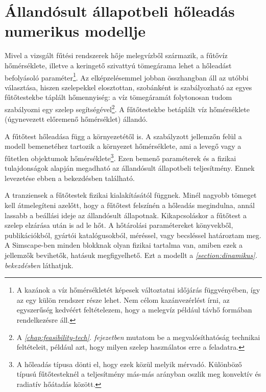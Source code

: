 \section{Állandósult állapotbeli hőleadás numerikus modellje}\label{section:allandosult}

Mivel a vizsgált fűtési rendszerek hője melegvízből származik, a fűtővíz %
hőmérséklete, illetve a keringető szivattyú tömegárama lehet a hőleadást befolyásoló paraméter\footnote{A kazánok a víz hőmérsékletét képesek változtatni időjárás függvényében, így az egy külön rendszer része lehet. Nem célom kazánvezérlést írni, az egyszerűség kedvéért feltételezem, hogy a melegvíz például távhő formában rendelkezésre áll.}. Az elképzelésemmel jobban összhangban áll az utóbbi választása, hiszen szelepekkel elosztottan, szobánként is szabályozható az egyes fűtőtestekbe táplált hőmennyiség: a víz tömegáramát folytonosan tudom szabályozni egy szelep segítségével\footnote{A \textit{\ref{chap:feasibility-tech}. fejezetben} mutatom be a megvalósíthatóság technikai feltételeit, például azt, hogy milyen szelep használatos erre a feladatra.}. A fűtőtestekbe betáplált víz hőmérséklete (úgynevezett előremenő hőmérséklet) állandó.


A fűtőtest hőleadása függ a környezetétől is. A szabályzott jellemzőn felül a modell bemenetéhez tartozik a környezet hőmérséklete, ami a levegő vagy a fűtetlen objektumok hőmérséklete\footnote{A hőleadás típusa dönti el, hogy ezek közül melyik mérvadó. Különböző típusú fűtőtesteknél a teljesítmény más-más arányban oszlik meg konvektív és radiatív hőátadás között.}.
Ezen bemenő paraméterek és a fizikai tulajdonságok alapján megadható az állandósult állapotbeli teljesítmény. Ennek levezetése ebben a bekezdésben található.

A tranziensek a fűtőtestek fizikai kialakításától függnek. Minél nagyobb tömeget kell átmelegíteni azelőtt, hogy a fűtőtest felszínén a hőleadás megindulna, annál lassabb a beállási ideje az állandósult állapotnak. Kikapcsoláskor a fűtőtest a szelep elzárása után is ad le hőt. %
A hőtárolási paramétereket könyvekből, publikációkból, gyártói katalógusokból, méréssel, vagy becsléssel határoztam meg. A Simscape-ben minden blokknak olyan fizikai tartalma van, amiben ezek a jellemzők bevihetők, hatásuk megfigyelhető. Ezt a modellt a \textit{\ref{section:dinamikus}. bekezdésben} láthatjuk.


